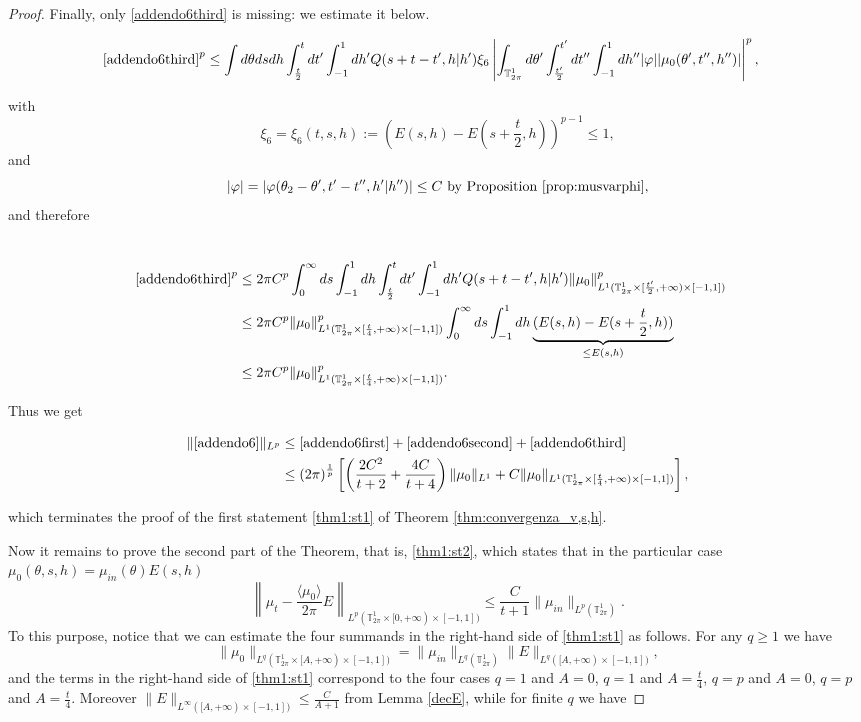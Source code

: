 \documentclass[a4paper,10pt,reqno]{amsart}
\numberwithin{equation}{subsection}
\numberwithin{figure}{subsection}
\begin{document}
\begin{proof}
Finally, only \eqref{addendo6third} is missing: we estimate it below.

{\scriptsize\begin{align*}
&\eqref{addendo6third}^p\leq\int d\theta dsdh\int_{\frac{t}{2}}^tdt'\int_{-1}^1dh'Q(s+t-t',h|h')\xi_6\left|\int_{\mathbb{T}^1_{2\pi}}d\theta'\int_{\frac{t'}{2}}^{t'}dt''\int_{-1}^1dh''|\varphi||\mu_0(\theta',t'',h'')|\right|^p,
\end{align*}}

with
\[
\xi_6=\xi_6(t,s,h):=\left(E(s,h)-E(s+\frac{t}{2},h)\right)^{p-1}\leq1,
\]
and
\[
|\varphi|=|\varphi(\theta_2-\theta',t'-t'',h'|h'')|\leq C\textrm{ by Proposition \ref{prop:musvarphi}},
\]
and therefore

{\small\begin{align*}
\\
\eqref{addendo6third}^p&\leq2\pi C^p\int_0^{\infty}ds\int_{-1}^1dh\int_{\frac{t}{2}}^tdt'\int_{-1}^1dh'Q(s+t-t',h|h')\|\mu_0\|_{L^1(\mathbb{T}^1_{2\pi}\times[\frac{t'}{2},+\infty)\times[-1,1])}^p
\\
&\leq2\pi C^p\|\mu_0\|_{L^1(\mathbb{T}^1_{2\pi}\times[\frac{t}{4},+\infty)\times[-1,1])}^p\int_0^{\infty}ds\int_{-1}^1dh\underbrace{(E(s,h)-E(s+\frac{t}{2},h))}_{\leq E(s,h)}
\\
&\leq 2\pi C^p\|\mu_0\|_{L^1(\mathbb{T}^1_{2\pi}\times[\frac{t}{4},+\infty)\times[-1,1])}^p.
\end{align*}}

Thus we get

\begin{align*}
\|\eqref{addendo6}\|_{L^p}&\leq\eqref{addendo6first}+\eqref{addendo6second}+\eqref{addendo6third}
\\
&\leq (2\pi)^\frac{1}{p}\left[\left(\frac{2C^2}{t+2}+\frac{4C}{t+4}\right)\|\mu_0\|_{L^1}+C\|\mu_0\|_{L^1(\mathbb{T}^1_{2\pi}\times[\frac{t}{4},+\infty)\times[-1,1])}\right],
\end{align*}

which terminates the proof of the first statement \eqref{thm1:st1} of Theorem \ref{thm:convergenza_v,s,h}.

Now it remains to prove the second part of the Theorem, that is, \eqref{thm1:st2}, which states that in the particular case $\mu_0(\theta,s,h)=\mu_{in}(\theta)E(s,h)$
\[
\left\|\mu_t-\frac{\langle\mu_0\rangle}{2\pi}E\right\|_{L^p(\mathbb{T}^1_{2\pi}\times[0,+\infty)\times[-1,1])}\leq\frac{C}{t+1}\|\mu_{in}\|_{L^p(\mathbb{T}^1_{2\pi})}.
\]
To this purpose, notice that we can estimate the four summands in the right-hand side of \eqref{thm1:st1} as follows. For any $q\geq1$ we have
\[
\|\mu_0\|_{L^q(\mathbb{T}^1_{2\pi}\times[A,+\infty)\times[-1,1])}=\|\mu_{in}\|_{L^q(\mathbb{T}^1_{2\pi})}\|E\|_{L^q([A,+\infty)\times[-1,1])},
\]
and the terms in the right-hand side of \eqref{thm1:st1} correspond to the four cases $q=1$ and  $A=0$, $q=1$ and $ A=\frac{t}{4}$, $q=p$ and $ A=0$, $q=p$ and $ A=\frac{t}{4}$. Moreover $\|E\|_{L^{\infty}([A,+\infty)\times[-1,1])}\leq\frac{C}{A+1}$ from Lemma \ref{decE}, while for finite $q$ we have


\end{proof}
\end{document}
